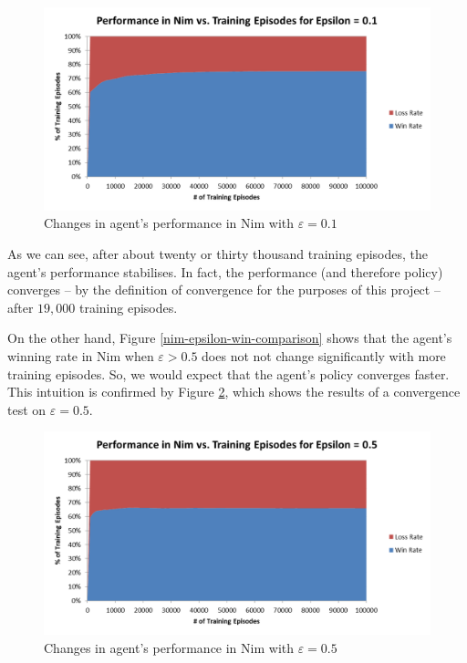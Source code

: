 \documentclass[11pt,a4paper]{report}
\begin{document}
\begin{figure}[htbp]
	\begin{center}
		\includegraphics[width=125mm]{Nim_PerformanceResults_0_1.png}
		\caption{Changes in agent's performance in Nim with $\varepsilon = 0.1$}
		\label{nim-0-1-convergence}
	\end{center}
\end{figure}

As we can see, after about twenty or thirty thousand training episodes, the agent's performance stabilises. In fact, the performance (and therefore policy) converges -- by the definition of convergence for the purposes of this project -- after $19,000$ training episodes.

On the other hand, Figure \ref{nim-epsilon-win-comparison} shows that the agent's winning rate in Nim when $\varepsilon > 0.5$ does not not change significantly with more training episodes. So, we would expect that the agent's policy converges faster. This intuition is confirmed by Figure \ref{nim-0-5-convergence}, which shows the results of a convergence test on $\varepsilon = 0.5$.

\begin{figure}[htbp]
	\begin{center}
		\includegraphics[width=125mm]{Nim_PerformanceResults_0_5.png}
		\caption{Changes in agent's performance in Nim with $\varepsilon = 0.5$}
		\label{nim-0-5-convergence}
	\end{center}
\end{figure}
\end{document}

